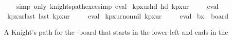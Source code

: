 \begin{isabellebody}
%
\isadelimproof
\ \ %
\endisadelimproof
%
\isatagproof
{}\isamarkupfalse%
\ {\isacharparenleft}{\kern0pt}simp\ only{\isacharcolon}{\kern0pt}\ knights{\isacharunderscore}{\kern0pt}path{\isacharunderscore}{\kern0pt}exec{\isacharunderscore}{\kern0pt}simp{\isacharparenright}{\kern0pt}\ eval%
\endisatagproof
{\isafoldproof}%
%
\isadelimproof
\isanewline
%
\endisadelimproof
\isanewline
{}\isamarkupfalse%
\ kp{\isacharunderscore}{\kern0pt}{}x{}{\isacharunderscore}{\kern0pt}ur{\isacharunderscore}{\kern0pt}hd{\isacharcolon}{\kern0pt}\ {\isachardoublequoteopen}hd\ kp{}x{}ur\ {\isacharequal}{\kern0pt}\ {\isacharparenleft}{\kern0pt}{}{\isacharcomma}{\kern0pt}{}{\isacharparenright}{\kern0pt}{\isachardoublequoteclose}%
\isadelimproof
\ %
\endisadelimproof
%
\isatagproof
{}\isamarkupfalse%
\ eval%
\endisatagproof
{\isafoldproof}%
%
\isadelimproof
%
\endisadelimproof
\isanewline
\isanewline
{}\isamarkupfalse%
\ kp{\isacharunderscore}{\kern0pt}{}x{}{\isacharunderscore}{\kern0pt}ur{\isacharunderscore}{\kern0pt}last{\isacharcolon}{\kern0pt}\ {\isachardoublequoteopen}last\ kp{}x{}ur\ {\isacharequal}{\kern0pt}\ {\isacharparenleft}{\kern0pt}{}{\isacharcomma}{\kern0pt}{}{\isacharparenright}{\kern0pt}{\isachardoublequoteclose}%
\isadelimproof
\ %
\endisadelimproof
%
\isatagproof
{}\isamarkupfalse%
\ eval%
\endisatagproof
{\isafoldproof}%
%
\isadelimproof
%
\endisadelimproof
\isanewline
\isanewline
{}\isamarkupfalse%
\ kp{\isacharunderscore}{\kern0pt}{}x{}{\isacharunderscore}{\kern0pt}ur{\isacharunderscore}{\kern0pt}non{\isacharunderscore}{\kern0pt}nil{\isacharcolon}{\kern0pt}\ {\isachardoublequoteopen}kp{}x{}ur\ {\isasymnoteq}\ {\isacharbrackleft}{\kern0pt}{\isacharbrackright}{\kern0pt}{\isachardoublequoteclose}%
\isadelimproof
\ %
\endisadelimproof
%
\isatagproof
{}\isamarkupfalse%
\ eval%
\endisatagproof
{\isafoldproof}%
%
\isadelimproof
%
\endisadelimproof
\isanewline
\isanewline
{}\isamarkupfalse%
\ {\isachardoublequoteopen}b{}x{}\ {\isasymequiv}\ board\ {}\ {}{\isachardoublequoteclose}%
\begin{isamarkuptext}%
A Knight's path for the -board that starts in the lower-left and ends in the 

\end{isamarkuptext}
\end{isabellebody}
